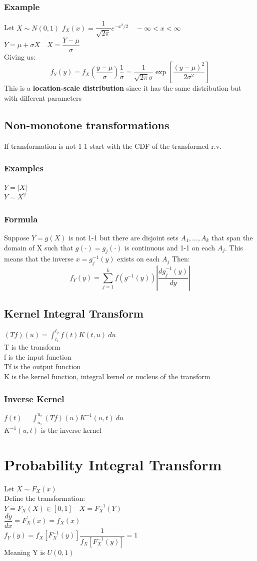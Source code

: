 \documentclass[openany]{book}
\begin{document}
\begin{flushleft}
\subsection{Example}
Let $X \sim N(0,1)$
$f_X(x)=\dfrac{1}{\sqrt{2\pi}}e^{-x^2/2} \quad -\infty <x<\infty$\\
$Y=\mu+\sigma X \quad X=\dfrac{Y-\mu}{\sigma}$\\
Giving us:
\[f_Y(y)=f_X \left(\dfrac{y-\mu}{\sigma}\right)\dfrac{1}{\sigma}=\dfrac{1}{\sqrt{2\pi}\sigma}\exp\left[\dfrac{(y-\mu)^2}{2\sigma^2}\right]
\]
This is a \textbf{location-scale distribution} since it has the same distribution but with different parameters
\section{Non-monotone transformations}
If transformation is not 1-1 start with the CDF of the transformed r.v.\\
\subsection{Examples}
$Y=|X|$\\
$Y=X^2$
\subsection{Formula}
Suppose $Y=g(X)$ is not 1-1 but there are disjoint sets $A_1,\dots, A_k$ that span the domain of X such that $g(\cdot)=g_j(\cdot)$ is continuous and 1-1 on each $A_j$. This means that the inverse $x=g_j^{-1}(y)$ exists on each $A_j$ Then:
\[f_Y(y)=\sum_{j=1}^{k}f(g^{-1}(y))\left|\dfrac{{dg}_j^{-1}(y)}{dy}\right|
\]
\section{Kernel Integral Transform}
$(Tf)(u)=\int_{t_i}^{t_2}f(t)K(t,u) \ du$\\
T is the transform\\
f is the input function\\
Tf is the output function\\
K is the kernel function, integral kernel or nucleus of the transform
\subsection{Inverse Kernel}
$f(t)=\int_{u_1}^{u_2}(Tf)(u)K^{-1}(u,t) \ du$\\
$K^{-1}(u,t)$ is the inverse kernel
\chapter{Probability Integral Transform}
Let $X\sim F_X(x)$\\
Define the transformation:\\
$Y=F_X(X) \in [0,1] \quad X=F_X^{-1}(Y)$\\
$\dfrac{dy}{dx}=F^{'}_X(x)=f_X(x)$\\
$f_Y(y)=f_X[F_X^{-1}(y)]\dfrac{1}{f_X[F_X^{-1}(y)]}=1$\\
Meaning Y is $U(0,1)$

\end{flushleft}
\end{document}

